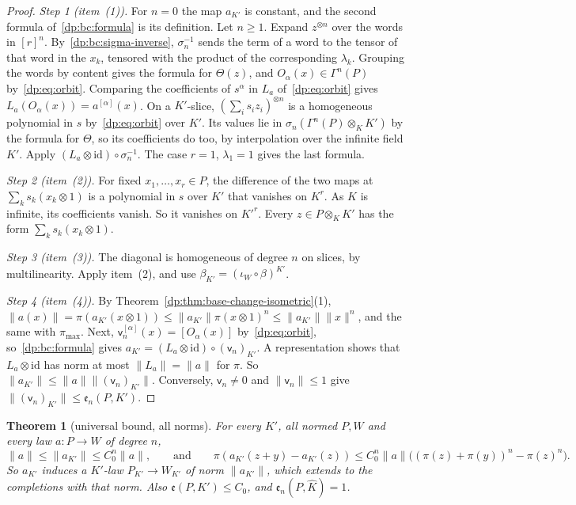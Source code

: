 \documentclass[11pt]{amsart}
\newtheorem{theorem}{Theorem}[section]
\theoremstyle{definition}
\theoremstyle{remark}
\numberwithin{equation}{section}
\newcommand{\id}{\mathrm{id}}
\newcommand{\norm}[1]{\lVert #1\rVert}
\newcommand{\Kh}{\widehat K}
\theoremstyle{plain}
\theoremstyle{definition}
\theoremstyle{plain}
\begin{document}
\begin{proof}
\emph{Step 1 (item~(1)).} For $n=0$ the map $a_{K'}$ is constant, and the second formula of~\eqref{dp:bc:formula} is its definition. Let $n\ge1$. Expand $z^{\otimes n}$ over the words in $[r]^n$. By~\eqref{dp:bc:sigma-inverse}, $\sigma_n^{-1}$ sends the term of a word to the tensor of that word in the $x_k$, tensored with the product of the corresponding $\lambda_k$. Grouping the words by content gives the formula for $\Theta(z)$, and $O_\alpha(x)\in\Gamma^n(P)$ by~\eqref{dp:eq:orbit}. Comparing the coefficients of $s^\alpha$ in $L_a$ of~\eqref{dp:eq:orbit} gives $L_a(O_\alpha(x))=a^{[\alpha]}(x)$. On a $K'$-slice, $(\sum_is_iz_i)^{\otimes n}$ is a homogeneous polynomial in $s$ by~\eqref{dp:eq:orbit} over $K'$. Its values lie in $\sigma_n(\Gamma^n(P)\otimes_KK')$ by the formula for $\Theta$, so its coefficients do too, by interpolation over the infinite field $K'$. Apply $(L_a\otimes\id)\circ\sigma_n^{-1}$. The case $r=1$, $\lambda_1=1$ gives the last formula.

\emph{Step 2 (item~(2)).} For fixed $x_1,\dots,x_r\in P$, the difference of the two maps at $\sum_ks_k(x_k\otimes1)$ is a polynomial in $s$ over $K'$ that vanishes on $K^r$. As $K$ is infinite, its coefficients vanish. So it vanishes on $K'^r$. Every $z\in P\otimes_KK'$ has the form $\sum_ks_k(x_k\otimes1)$.

\emph{Step 3 (item~(3)).} The diagonal is homogeneous of degree $n$ on slices, by multilinearity. Apply item~(2), and use $\beta_{K'}=(\iota_W\circ\beta)^{K'}$.

\emph{Step 4 (item~(4)).} By Theorem~\ref{dp:thm:base-change-isometric}(1), $\norm{a(x)}=\pi(a_{K'}(x\otimes1))\le\norm{a_{K'}}\pi(x\otimes1)^n\le\norm{a_{K'}}\norm x^n$, and the same with $\pi_{\max}$. Next, $\mathsf v_n^{[\alpha]}(x)=[O_\alpha(x)]$ by~\eqref{dp:eq:orbit}, so~\eqref{dp:bc:formula} gives $a_{K'}=(L_a\otimes\id)\circ(\mathsf v_n)_{K'}$. A representation shows that $L_a\otimes\id$ has norm at most $\norm{L_a}=\norm a$ for $\pi$. So $\norm{a_{K'}}\le\norm a\norm{(\mathsf v_n)_{K'}}$. Conversely, $\mathsf v_n\ne0$ and $\norm{\mathsf v_n}\le1$ give $\norm{(\mathsf v_n)_{K'}}\le\mathfrak e_n(P,K')$.
\end{proof}

\begin{theorem}[universal bound, all norms]\label{dp:thm:base-change-law}
For every $K'$, all normed $P,W$ and every law $a\colon P\to W$ of degree $n$,
\begin{equation}\label{dp:bc:bound}
 \norm a\le\norm{a_{K'}}\le C_0^n\norm a,\qquad\text{and}\qquad\pi(a_{K'}(z+y)-a_{K'}(z))\le C_0^n\norm a\bigl((\pi(z)+\pi(y))^n-\pi(z)^n\bigr).
\end{equation}
So $a_{K'}$ induces a $K'$-law $P_{K'}\to W_{K'}$ of norm $\norm{a_{K'}}$, which extends to the completions with that norm. Also $\mathfrak e(P,K')\le C_0$, and $\mathfrak e_n(P,\Kh)=1$.
\end{theorem}
\end{document}
